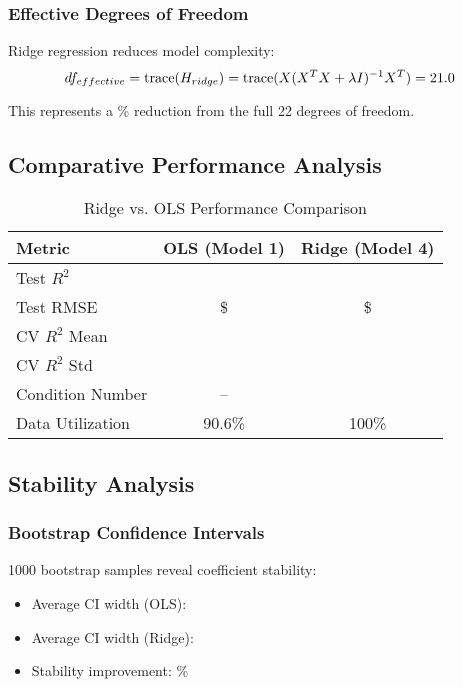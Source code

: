 \subsubsection{Effective Degrees of Freedom}

Ridge regression reduces model complexity:
\begin{equation}
df_{effective} = \text{trace}(H_{ridge}) = \text{trace}(X(X^TX + \lambda I)^{-1}X^T) = 21.0{}
\end{equation}

This represents a \ModelFourDOFReduction{}\% reduction from the full 22 degrees of freedom.

\subsection{Comparative Performance Analysis}

\begin{table}[h]
\centering
\caption{Ridge vs. OLS Performance Comparison}
\begin{tabular}{lcc}
\toprule
\textbf{Metric} & \textbf{OLS (Model 1)} & \textbf{Ridge (Model 4)} \\
\midrule
Test $R^2$ & \ModelOneRSquaredTest{} & \ModelFourRSquaredTest{} \\
Test RMSE & \$\ModelOneRMSETest{} & \$\ModelFourRMSETest{} \\
CV $R^2$ Mean & \ModelOneCVMean{} & \ModelFourCVMean{} \\
CV $R^2$ Std & \ModelOneCVStd{} & \ModelFourCVStd{} \\
Condition Number & --%
                & \ModelFourConditionNumber{} \\
Data Utilization & 90.6\% & 100\% \\
\bottomrule
\end{tabular}
\end{table}

\subsection{Stability Analysis}

\subsubsection{Bootstrap Confidence Intervals}

1000 bootstrap samples reveal coefficient stability:
\begin{itemize}
    \item Average CI width (OLS): \ModelFourOLSCIWidth{}
    \item Average CI width (Ridge): \ModelFourRidgeCIWidth{}
    \item Stability improvement: \ModelFourStabilityImprovement{}\%
\end{itemize}

